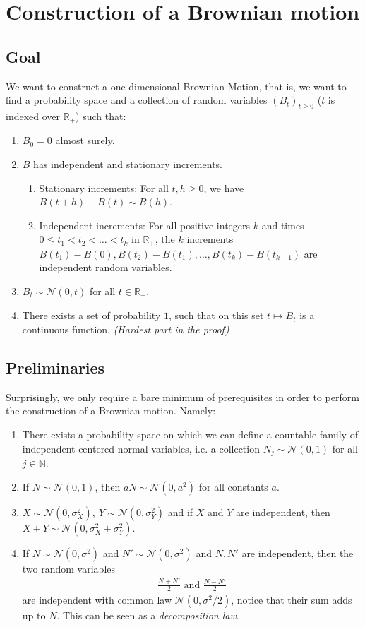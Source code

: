 \documentclass[../mainfile.tex]{subfiles}
\begin{document}
\section{Construction of a Brownian motion}
\subsection{Goal}
We want to construct a one-dimensional Brownian Motion, that is, we want to find a probability space and a collection of random variables $(B_t)_{t \geq 0}$ ($t$ is indexed over $\mathbb{R}_+$) such that:
\begin{enumerate}
\item $B_0=0$ almost surely.
\item $B$ has independent and stationary increments.
\begin{enumerate}
\item Stationary increments: For all $t,h \geq 0$, we have $B(t+h)-B(t) \sim B(h)$.
\item Independent increments: For all positive integers $k$ and times $0 \leq t_1 < t_2 < \dots < t_k$ in $\mathbb{R}_+$, the $k$ increments $B(t_1)-B(0), B(t_2)-B(t_1), \dots , B(t_k)-B(t_{k-1})$ are independent random variables. 
\end{enumerate}
\item $B_t \sim \mathcal{N}(0,t)$ for all $t \in \mathbb{R}_+$.
\item There exists a set of probability $1$, such that on this set $t \mapsto B_t$ is a continuous function. \textit{(Hardest part in the proof)}
\end{enumerate}
\subsection{Preliminaries}
Surprisingly, we only require a bare minimum of prerequisites in order to perform the construction of a Brownian motion. Namely:
\begin{enumerate}
\item There exists a probability space on which we can define a countable family of independent centered normal variables, i.e. a collection $N_j \sim \mathcal{N}(0,1)$ for all $j \in \mathbb{N}$. 
\item If $N \sim \mathcal{N}(0,1)$, then $aN \sim \mathcal{N}(0,a^2)$ for all constants $a$. 
\item $X \sim \mathcal{N}(0, \sigma_X^2), \ Y \sim \mathcal{N}(0, \sigma_Y^2)$ and if $X$ and $Y$ are independent, then $X+Y \sim \mathcal{N}(0, \sigma_X^2 + \sigma_Y^2)$. 
\item If $N \sim \mathcal{N}(0, \sigma^2)$ and $N' \sim \mathcal{N}(0, \sigma^2)$ and $N,N'$ are independent, then the two random variables 
\begin{align*}
\frac{N+N'}{2} \text{ and } \frac{N-N'}{2}
\end{align*}
are independent with common law $\mathcal{N}(0, \sigma^2/2)$, notice that their sum adds up to $N$. This can be seen as a \textit{decomposition law}. 
\end{enumerate}
\newpage
\end{document}
